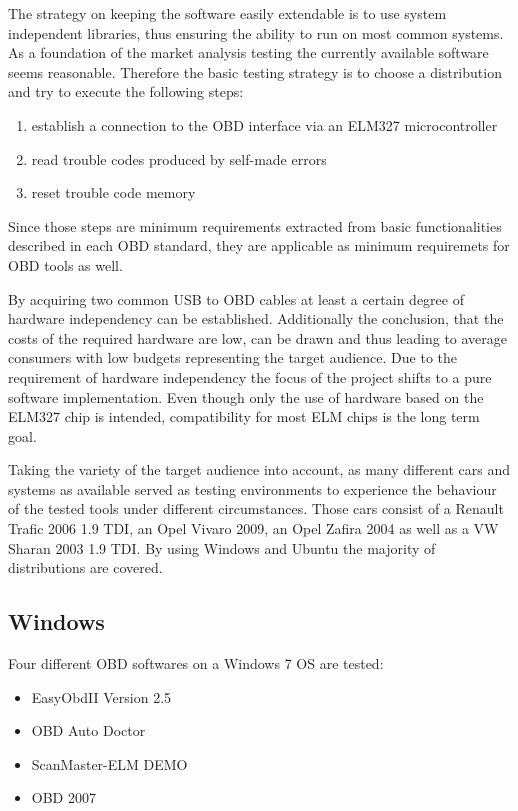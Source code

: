The strategy on keeping the software easily extendable is to use system independent libraries, thus 
ensuring the ability to run on most common systems. As a foundation of the market analysis testing the currently available software seems reasonable. 
Therefore the basic testing strategy is to choose a distribution and try to execute the following steps:

\begin{enumerate}
 \item establish a connection to the OBD interface via an ELM327 microcontroller 
 \item read trouble codes produced by self-made errors
 \item reset trouble code memory
\end{enumerate}

Since those steps are minimum requirements extracted from basic functionalities described in each OBD standard, they are applicable as minimum 
requiremets for OBD tools as well. 

By acquiring two common USB to OBD cables at least a certain degree of hardware independency can be established. 
Additionally the conclusion, that the costs of the required hardware are low, can be drawn and thus leading to average consumers with low budgets 
representing the target audience. Due to the requirement of hardware independency the focus of the project shifts to a pure software implementation. 
Even though only the use of hardware based on the ELM327 chip is intended, compatibility for most ELM chips is the long term goal. 

Taking the variety of the target audience into account, as many different cars and systems as available served as testing environments to experience 
the behaviour of the tested tools under different circumstances. Those cars consist of a Renault Trafic 2006 1.9 TDI, an Opel Vivaro 2009, 
an Opel Zafira 2004 as well as a VW Sharan 2003 1.9 TDI. By using Windows and Ubuntu the majority of distributions are covered.

\subsection{Windows}
Four different OBD softwares on a Windows 7 OS are tested:

\begin{itemize}
 \item EasyObdII Version 2.5
 \item OBD Auto Doctor
 \item ScanMaster-ELM DEMO
 \item OBD 2007
\end{itemize}

